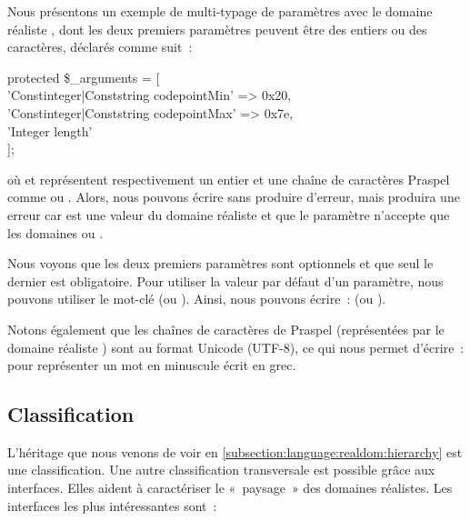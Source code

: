 \begin{example}

Nous présentons un exemple de multi-typage de paramètres avec le domaine
réaliste , dont les deux premiers paramètres peuvent être des
entiers ou des caractères, déclarés comme suit~:
%
\begin{pre}
protected \$_arguments = [ \\
    'Constinteger|Conststring codepointMin' => 0x20, \\
    'Constinteger|Conststring codepointMax' => 0x7e, \\
    'Integer                  length' \\
];
\end{pre}
%
où  et  représentent respectivement un
entier et une chaîne de caractères Praspel comme  ou .
Alors, nous pouvons écrire  sans produire
d'erreur, mais  produira une erreur car
 est une valeur du domaine réaliste  et que le
paramètre  n'accepte que les domaines  ou
.

Nous voyons que les deux premiers paramètres sont optionnels et que seul le
dernier est obligatoire. Pour utiliser la valeur par défaut d'un paramètre, nous
pouvons utiliser le mot-clé  (ou ). Ainsi, nous pouvons
écrire~:  (ou ).

Notons également que les chaînes de caractères de Praspel (représentées par le
domaine réaliste ) sont au format Unicode (UTF-8), ce qui nous
permet d'écrire~:  pour représenter
un mot en minuscule écrit en grec.

\end{example}

\subsection{Classification}
\label{subsection:language:realdom:classification}

L'héritage que nous venons de voir en
\ref{subsection:language:realdom:hierarchy} est une classification. Une autre
classification {\strong transversale} est possible grâce aux {\strong
interfaces}. Elles aident à caractériser le «~paysage~» des domaines réalistes.
Les interfaces les plus intéressantes sont~:

